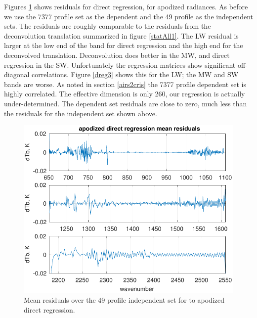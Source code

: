 \documentclass[10pt,twocolumn]{article}
\begin{document}
Figures \ref{dreg1} shows residuals for direct regression, for
apodized radiances.  As before we use the 7377 profile set as the
dependent and the 49 profile as the independent sets.  The residuals
are roughly comparable to the residuals from the deconvolution
translation summarized in figure \ref{statAll1}.  The LW residual is
larger at the low end of the band for direct regression and the high
end for the deconvolved translation.  Deconvolution does better in
the MW, and direct regression in the SW.   Unfortunately the
regression matrices show significant off-diagonal correlations.
Figure \ref{dreg3} shows this for the LW; the MW and SW bands are
worse.  As noted in section \ref{airs2cris} the 7377 profile
dependent set is highly correlated.  The effective dimension is only
260, our regression is actually under-determined.  The dependent set
residuals are close to zero, much less than the residuals for the
independent set shown above.

\begin{figure} %
  \centering
  \includegraphics[width=\linewidth]{figures/ap_dir_regr.pdf}
  \caption{Mean residuals over the 49 profile independent set for
    {\airs} to apodized {\cris} direct regression.}
  \label{dreg1}
\end{figure}
\end{document}
